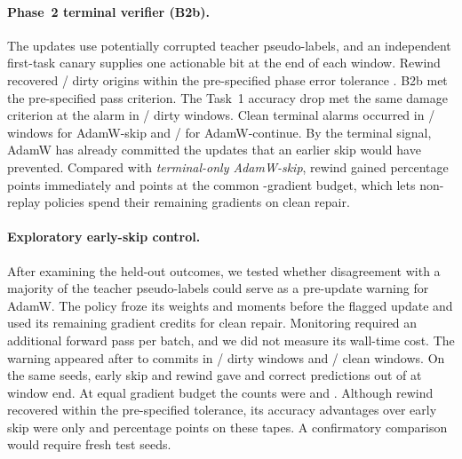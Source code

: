 \paragraph{Phase~2 terminal verifier (B2b).}
The updates use potentially corrupted teacher pseudo-labels, and
an independent first-task canary supplies one actionable bit at
the end of each window. Rewind recovered
\PtwoTerminalRecovered{}/\PtwoSeeds{} dirty origins within the
pre-specified phase error tolerance \PtwoAlarmTargetTol{}.
B2b met the pre-specified pass criterion. The Task~1 accuracy
drop met the same damage criterion at the alarm in
\PtwoTerminalDamaged{}/\PtwoSeeds{} dirty windows. Clean terminal alarms occurred in
\PtwoTerminalAdamSkipCleanAlarms{}/\PtwoSeeds{} windows for AdamW-skip
and \PtwoTerminalAdamContinueCleanAlarms{}/\PtwoSeeds{} for
AdamW-continue. By the terminal signal, AdamW has already
committed the \PtwoTerminalUpdates{} updates that an earlier
skip would have prevented. Compared with
\emph{terminal-only AdamW-skip}, rewind gained
\PtwoTerminalAdamImmediate{} percentage points immediately and
\PtwoTerminalAdamBudget{} points at the common
\PtwoTerminalBudget{}-gradient budget, which lets non-replay
policies spend their remaining gradients on clean repair.

\paragraph{Exploratory early-skip control.}
After examining the held-out outcomes, we tested whether
disagreement with a majority of the teacher pseudo-labels could
serve as a pre-update warning for AdamW. The policy froze its
weights and moments before the flagged update and used its
remaining gradient credits for clean repair. Monitoring required
an additional forward pass per batch, and we did not measure its
wall-time cost. The warning appeared after \PtwoEarlyWarnFirst{}
to \PtwoEarlyWarnLast{} commits in \PtwoEarlyWarnDirty{}/\PtwoSeeds{}
dirty windows and \PtwoEarlyWarnClean{}/\PtwoSeeds{} clean windows.
On the same seeds, early skip and rewind gave
\PtwoEarlySkipImmediateCorrect{} and \PtwoRewindImmediateCorrect{}
correct predictions out of \PtwoTerminalTotal{} at window end.
At equal gradient budget the counts were
\PtwoEarlySkipBudgetCorrect{} and \PtwoRewindBudgetCorrect{}.
Although rewind recovered within the pre-specified tolerance,
its accuracy advantages over early skip were only
\PtwoEarlyImmediateDelta{} and \PtwoEarlyBudgetDelta{} percentage
points on these tapes. A confirmatory comparison would require
fresh test seeds.

